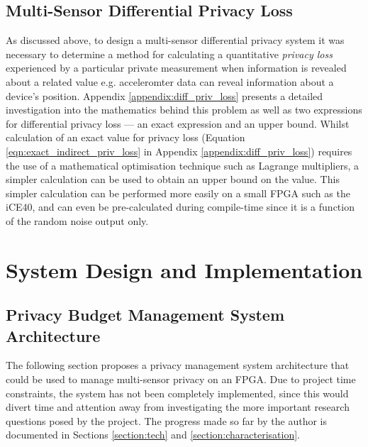 \documentclass[12pt]{article}
\begin{document}
    \subsection{Multi-Sensor Differential Privacy Loss}
      As discussed above, to design a multi-sensor differential privacy system it was necessary to determine a method for calculating a quantitative \textit{privacy loss} experienced by a particular private measurement when information is revealed about a related value e.g. acceleromter data can reveal information about a device's position. Appendix \ref{appendix:diff_priv_loss} presents a detailed investigation into the mathematics behind this problem as well as two expressions for differential privacy loss --- an exact expression and an upper bound. Whilst calculation of an exact value for privacy loss (Equation \ref{eqn:exact_indirect_priv_loss} in Appendix \ref{appendix:diff_priv_loss}) requires the use of a mathematical optimisation technique such as Lagrange multipliers, a simpler calculation can be used to obtain an upper bound on the value. This simpler calculation can be performed more easily on a small FPGA such as the iCE40, and can even be pre-calculated during compile-time since it is a function of the random noise output only.

\newpage
\section{System Design and Implementation}
  \subsection{Privacy Budget Management System Architecture} \label{subsection:privacy_budget_system_arch}
    The following section proposes a privacy management system architecture that could be used to manage multi-sensor privacy on an FPGA. Due to project time constraints, the system has not been completely implemented, since this would divert time and attention away from investigating the more important research questions posed by the project. The progress made so far by the author is documented in Sections \ref{section:tech} and \ref{section:characterisation}.\\
\end{document}
